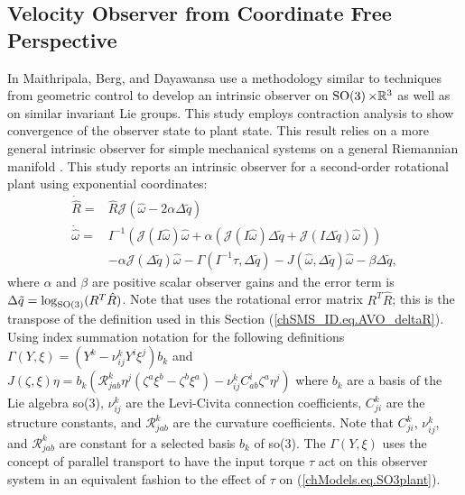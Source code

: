 \subsection{Velocity Observer from Coordinate Free Perspective}
\label{chSMS_ID.sec.AVO_TT}

In \cite{Maithripala2004} Maithripala, Berg, and Dayawansa use a
methodology similar to techniques from geometric control to develop an
intrinsic observer on $\SO3\times \mathbb{R}^3$ as well as on similar
invariant Lie groups.  This study employs contraction analysis to show
convergence of the observer state to plant state.  This result relies
on a more general intrinsic observer for simple mechanical systems on
a general Riemannian manifold \cite{Aghannan2003}. This study reports an
intrinsic observer for a second-order rotational plant using
exponential coordinates:
%
\begin{align}\label{chSMS_ID.eq.AVO_TT}
\dot{\hat{R}}=&\hat{R} \mathcal{J}\left(\hat{\omega}-2\alpha \Delta \tilde{q}\right)
                                                          \nonumber \\
\dot{\hat{\omega}} 
  =&I^{-1}\left(\mathcal{J}\left(I \hat{\omega}\right)\hat{\omega}+
    \alpha \left(\mathcal{J}\left(I\hat{\omega}\right)\Delta \tilde{q} +\mathcal{J}\left(I \Delta \tilde{q}\right)\hat{\omega}\right)\right) 
                                                          \nonumber \\
    &-\alpha \mathcal{J}\left(\Delta \tilde{q}\right)\hat{\omega}-\Gamma(I^{-1}\tau,\Delta \tilde{q})
     -J(\hat{\omega},\Delta \tilde{q})\hat{\omega}-\beta \Delta \tilde{q},
\end{align}
%
\noindent 
where $\alpha$ and $\beta$ are positive scalar observer gains and the
error term is $\Delta \tilde{q}=\log_{\SO3}(R^T \hat{R})$. Note that
\cite{Maithripala2004} uses the rotational error matrix
$R^T\hat{R}$; this is the transpose of the definition used in this
Section (\ref{chSMS_ID.eq.AVO_deltaR}). Using index summation notation for
the following definitions $\Gamma(Y,\xi)=\left(Y^k-\nu_{ij}^k Y^i
  \xi^j\right)b_k$ and $J(\zeta,\xi)\eta=b_k\left(\mathcal{R}_{jab}^k
  \eta^j(\zeta^a \xi^b-\zeta^b \xi^a)-\nu_{ij}^k
  C_{ab}^i\zeta^a\eta^j\right)$ where $b_k$ are a basis of the Lie
algebra so(3), $\nu_{ij}^k$ are the Levi-Civita connection
coefficients, $C_{ji}^k$ are the structure constants, and
$\mathcal{R}_{jab}^k$ are the curvature coefficients.  Note that
$C_{ji}^k$, $\nu_{ij}^k$, and $\mathcal{R}_{jab}^k$ are constant for a
selected basis {$b_k$} of so(3). The $\Gamma(Y,\xi)$ uses the concept
of parallel transport to have the input torque $\tau$ act on this
observer system in an equivalent fashion to the effect of $\tau$ on
(\ref{chModels.eq.SO3plant}).
